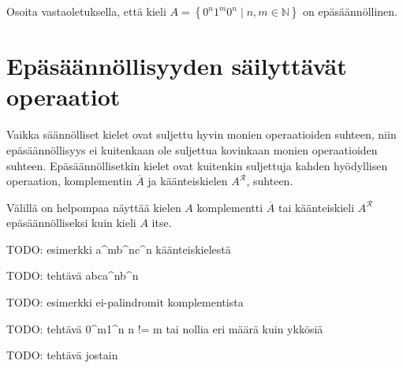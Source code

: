 \documentclass[a4paper,11pt]{article}
\theoremstyle{definition}
\newcommand{\set}[1]{{\left\{ #1 \right\}}}
\newcommand{\Nat}{\mathbb{N}}
\begin{document}
\begin{exercise}
    Osoita vastaoletuksella, että kieli \mbox{$A = \set{0^n1^m0^n \mid n,m \in
            \Nat}$} on epäsäännöllinen.
\end{exercise}

\section*{Epäsäännöllisyyden säilyttävät operaatiot}

Vaikka säännölliset kielet ovat suljettu hyvin monien operaatioiden suhteen,
niin epäsäännöllisyys ei kuitenkaan ole suljettua kovinkaan monien
operaatioiden suhteen. Epäsäännöllisetkin kielet ovat kuitenkin suljettuja
kahden hyödyllisen operaation, komplementin $\overline{A}$ ja käänteiskielen
$A^\mathcal{R}$, suhteen.

Välillä on helpompaa näyttää kielen $A$ komplementti $\overline{A}$ tai
käänteiskieli $A^\mathcal{R}$ epäsäännölliseksi kuin kieli $A$ itse.

TODO: esimerkki a^mb^nc^n käänteiskielestä

TODO: tehtävä abca^nb^n

TODO: esimerkki ei-palindromit komplementista

TODO: tehtävä 0^m1^n n != m tai nollia eri määrä kuin ykkösiä

TODO: tehtävä jostain
\end{document}
